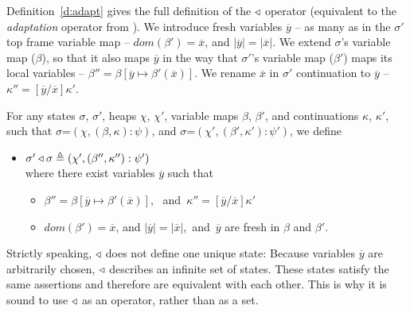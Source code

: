  

Definition~\ref{d:adapt} gives the full definition of the $\triangleleft$ operator
(equivalent to the \emph{adaptation} operator from \cite{FASE}).
We introduce fresh variables  $\overline{y}$ -- as many as in the $\sigma'$ top frame variable map
-- $dom(\beta')=\overline{x}$,  and $|\overline{y}| = |\overline{x}|$.  
We extend $\sigma$'s variable map ($\beta$), so that it also maps $\overline{y}$ 
in the way that  $\sigma'$'s variable map ($\beta'$) maps its local variables -- $\beta'' =  \beta[\overline{y} \mapsto  {\beta'(\overline{x})}]$. We rename $\overline{x}$   in $\sigma'$ continuation
to $\overline{y}$ --  $\kappa''=[\overline{y}/\overline{x}]\kappa'$.

 
 
\begin{definition}
\label{d:adapt}
For any states $\sigma$, $\sigma'$, heaps $\chi$, $\chi'$, %
variable maps $\beta$, $\beta'$, 
and continuations $\kappa$, $\kappa'$, such that 
$\sigma$=$(\chi,(\beta,\kappa):\psi)$, and $\sigma$=$(\chi',(\beta',\kappa'):\psi')$, we define 
\begin{itemize}
\item $\sigma' \triangleleft \sigma \triangleq (\chi', (\beta'',\kappa'') : \psi')$ \\
where there exist variables $\overline{y}$ such that
\begin{itemize}
\item
$\beta'' =  \beta[\overline{y} \mapsto  {\beta'(\overline{x})}]$, \ and\  $\kappa''=[\overline{y}/\overline{x}]\kappa'$
\item
$dom(\beta')=\overline{x}$,  and $|\overline{y}| = |\overline{x}|$,\  and\  $\overline{y}$ are fresh in $\beta$ and $\beta'$.
\end{itemize}
\end{itemize}
\end{definition}



{Strictly speaking, $\triangleleft$  does not define one  unique state: Because  variables $\overline{y}$ 
are arbitrarily chosen,   $\triangleleft$ describes an infinite set of states. These states satisfy the same assertions
and therefore are   equivalent with each 
other.
This is why it is sound to  use $\triangleleft$  as an operator, rather than as a set.
}

